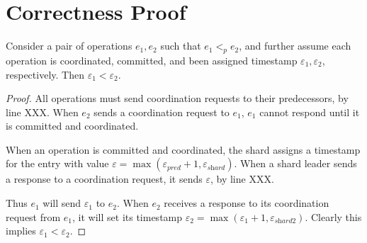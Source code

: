 \section{Correctness Proof}
\label{sec:correctness}


\begin{lem}
\label{lemma1}
Consider a pair of operations $e_1, e_2$ such that $e_1 <_p e_2$, and further assume each operation is coordinated, committed, and been assigned timestamp $\varepsilon_1, \varepsilon_2$, respectively. Then $\varepsilon_1 < \varepsilon_2$.
\end{lem}
\begin{proof}
All operations must send coordination requests to their predecessors, by line XXX. When $e_2$ sends a coordination request to $e_1$, $e_1$ cannot respond until it is committed and coordinated.

When an operation is committed and coordinated, the shard assigns a timestamp for the entry with value $\varepsilon = \max(\varepsilon_{\textit{pred}}+1, \varepsilon_{\textit{shard}})$.
When a shard leader sends a response to a coordination request, it sends $\varepsilon$, by line XXX.

Thus $e_1$ will send $\varepsilon_1$ to $e_2$. When $e_2$ receives a response to its coordination request from $e_1$, it will set its timestamp $\varepsilon_2 = \max(\varepsilon_1+1, \varepsilon_{\textit{shard2}})$.
Clearly this implies $\varepsilon_1 < \varepsilon_2$.
\end{proof}

